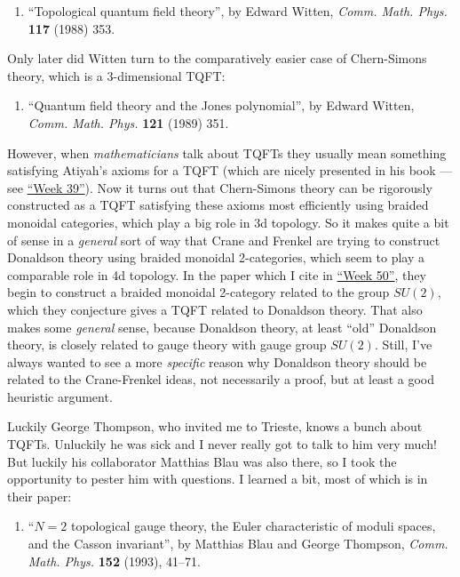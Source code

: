 \documentclass{article}
\def\tightlist{}
\begin{document}
\begin{enumerate}
\def\labelenumi{\arabic{enumi})}
\tightlist
\item
  ``Topological quantum field theory'', by Edward Witten, \emph{Comm.
  Math. Phys.} \textbf{117} (1988) 353.
\end{enumerate}

Only later did Witten turn to the comparatively easier case of
Chern-Simons theory, which is a 3-dimensional TQFT:

\begin{enumerate}
\def\labelenumi{\arabic{enumi})}
\setcounter{enumi}{1}
\tightlist
\item
  ``Quantum field theory and the Jones polynomial'', by Edward Witten,
  \emph{Comm. Math. Phys.} \textbf{121} (1989) 351.
\end{enumerate}

However, when \emph{mathematicians} talk about TQFTs they usually mean
something satisfying Atiyah's axioms for a TQFT (which are nicely
presented in his book --- see \protect\hyperlink{week39}{``Week 39''}).
Now it turns out that Chern-Simons theory can be rigorously constructed
as a TQFT satisfying these axioms most efficiently using braided
monoidal categories, which play a big role in 3d topology. So it makes
quite a bit of sense in a \emph{general} sort of way that Crane and
Frenkel are trying to construct Donaldson theory using braided monoidal
2-categories, which seem to play a comparable role in 4d topology. In
the paper which I cite in \protect\hyperlink{week50}{``Week 50''}, they
begin to construct a braided monoidal 2-category related to the group
\(SU(2)\), which they conjecture gives a TQFT related to Donaldson
theory. That also makes some \emph{general} sense, because Donaldson
theory, at least ``old'' Donaldson theory, is closely related to gauge
theory with gauge group \(SU(2)\). Still, I've always wanted to see a
more \emph{specific} reason why Donaldson theory should be related to
the Crane-Frenkel ideas, not necessarily a proof, but at least a good
heuristic argument.

Luckily George Thompson, who invited me to Trieste, knows a bunch about
TQFTs. Unluckily he was sick and I never really got to talk to him very
much! But luckily his collaborator Matthias Blau was also there, so I
took the opportunity to pester him with questions. I learned a bit, most
of which is in their paper:

\begin{enumerate}
\def\labelenumi{\arabic{enumi})}
\setcounter{enumi}{2}
\tightlist
\item
  ``\(N = 2\) topological gauge theory, the Euler characteristic of
  moduli spaces, and the Casson invariant'', by Matthias Blau and George
  Thompson, \emph{Comm. Math. Phys.} \textbf{152} (1993), 41--71.
\end{enumerate}
\end{document}
